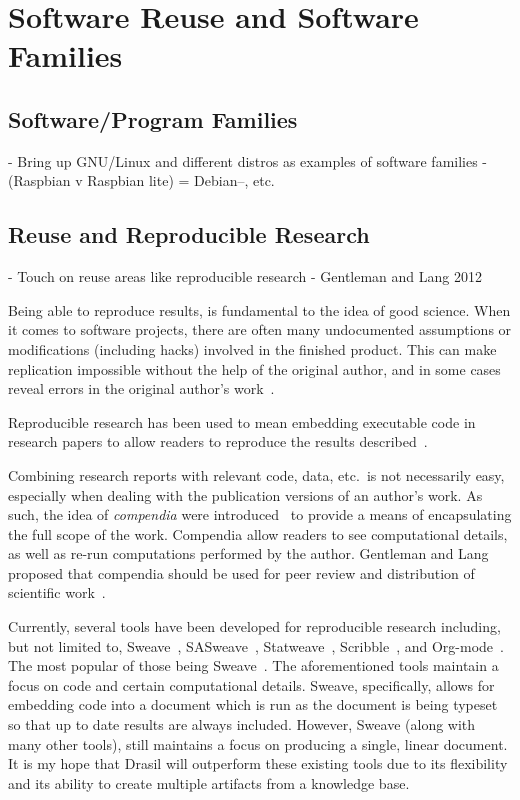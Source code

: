 \section{Software Reuse and Software Families}
\subsection{Software/Program Families}
  - Bring up GNU/Linux and different distros as examples of software families
    - (Raspbian v Raspbian lite) = Debian--, etc.
\subsection{Reuse and Reproducible Research}
  - Touch on reuse areas like reproducible research - Gentleman and Lang 2012

Being able to reproduce results, is fundamental to the idea of good science.
When it comes to software projects, there are often many undocumented
assumptions or modifications (including hacks) involved in the finished product.
This can make replication impossible without the help of the original author,
and in some cases reveal errors in the original author's
work~\cite{IonescuAndJansson2013}.

Reproducible research has been used to mean embedding executable code in
research papers to allow readers to reproduce the results
described~\cite{SchulteEtAl2012}.

Combining research reports with relevant code, data, etc.\ is not necessarily
easy, especially when dealing with the publication versions of an author's work.
As such, the idea of \emph{compendia} were
introduced~\cite{GentlemanAndLang2012} to provide a means of encapsulating the
full scope of the work. Compendia allow readers to see computational details, as
well as re-run computations performed by the author. Gentleman and Lang proposed
that compendia should be used for peer review and distribution of scientific
work~\cite{GentlemanAndLang2012}.

Currently, several tools have been developed for reproducible research
including, but not limited to, Sweave~\cite{Leisch2002},
SASweave~\cite{LenthEtAl2007}, Statweave~\cite{Lenth2009},
Scribble~\cite{FlattEtAl2009}, and Org-mode~\cite{SchulteEtAl2012}. The most
popular of those being Sweave~\cite{SchulteEtAl2012}. The aforementioned tools
maintain a focus on code and certain computational details. Sweave,
specifically, allows for embedding code into a document which is run as the
document is being typeset so that up to date results are always included.
However, Sweave (along with many other tools), still maintains a focus on
producing a single, linear document. It is my hope that Drasil will outperform
these existing tools due to its flexibility and its ability to create multiple
artifacts from a knowledge base.

